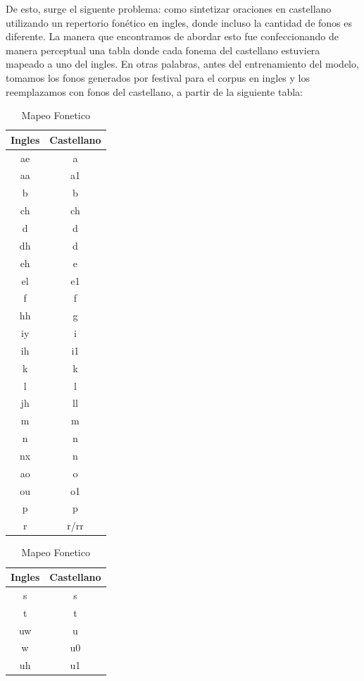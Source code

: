 De esto, surge el siguente problema: como sintetizar oraciones en castellano utilizando un repertorio fonético en ingles, donde incluso la cantidad de fonos es diferente. La manera que encontramos de abordar esto fue confeccionando de manera perceptual una tabla donde cada fonema del castellano estuviera mapeado a uno del ingles. En otras palabras, antes del entrenamiento del modelo, tomamos los fonos generados por festival para el corpus en ingles y los reemplazamos con fonos del castellano, a partir de la siguiente tabla:
\begin{table}
\centering
\caption{Mapeo Fonetico}
\begin{minipage}[t]{0.3\textwidth}
\begin{tabular}[t]{c|c}
\toprule
Ingles & Castellano \\
\midrule
ae & a\\  
aa & a1\\  
b & b\\  
ch & ch\\  
d & d\\  
dh & d\\  
eh & e\\  
el & e1\\  
f & f\\  
hh & g\\  
iy & i\\  
ih & i1\\  
k & k\\  
l & l\\  
jh & ll\\  
m & m\\  
n & n\\  
nx & n\\  
ao & o\\  
ou & o1\\  
p & p\\  
r & r/rr\\  
\bottomrule
\end{tabular}
\end{minipage}
\begin{minipage}[t]{0.3\textwidth}
\begin{tabular}[t]{c|c}
\toprule
Ingles & Castellano \\ 
\midrule
s & s\\  
t & t\\  
uw & u\\  
w & u0\\  
uh & u1\\  

\end{tabular}
\end{minipage}
\end{table}
